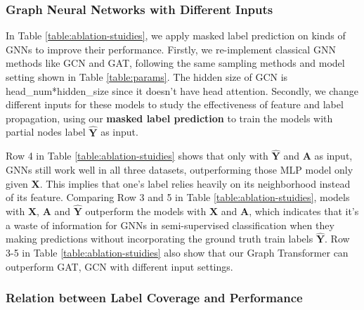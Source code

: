  
 \subsubsection{Graph Neural Networks with Different Inputs}
 In Table \ref{table:ablation-stuidies}, we apply masked label prediction on kinds of GNNs to improve their performance. Firstly, we re-implement classical GNN methods like GCN and GAT, following the same sampling methods and model setting shown in Table \ref{table:params}. The hidden size of GCN is head\_num*hidden\_size since it doesn't have head attention. Secondly, we change different inputs for these models to study the effectiveness of feature and label propagation, using our {\bf masked label prediction} to train the models with partial nodes label $\mathbf{\hat{Y}}$ as input.
  


Row 4 in Table \ref{table:ablation-stuidies} shows that only with $\mathbf{\hat{Y}}$ and  $\mathbf{A}$ as input, GNNs still work well in all three datasets, outperforming those MLP model only given $\mathbf{X}$. This implies that one's label relies heavily on its neighborhood instead of its feature. Comparing Row 3 and 5 in Table \ref{table:ablation-stuidies}, models with $\mathbf{X}$, $\mathbf{A}$ and $\mathbf{\hat{Y}}$ outperform the models with $\mathbf{X}$ and $\mathbf{A}$, which indicates that it's a waste of information for GNNs in semi-supervised classification when they making predictions without incorporating the ground truth train labels $\mathbf{\hat{Y}}$. Row 3-5 in Table \ref{table:ablation-stuidies} also show that our Graph Transformer can outperform GAT, GCN with different input settings.


\subsubsection{Relation between Label Coverage and Performance}

